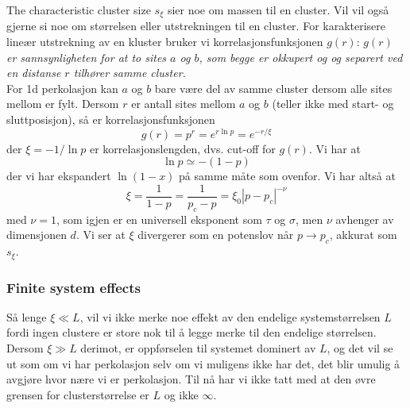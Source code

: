 \documentclass[english, a4paper]{article}
\begin{document}
\noindent
The characteristic cluster size $s_\xi$ sier noe om massen til en cluster. Vil vil også
gjerne si noe om størrelsen eller utstrekningen til en cluster. For karakterisere lineær
utstrekning av en kluster bruker vi korrelasjonsfunksjonen $g(r)$:
\indent \textit{$g(r)$ er sannsynligheten for at to sites $a$ og $b$, som begge er okkupert og
og separert ved en distanse $r$ tilhører samme cluster. }\\

\noindent
For 1d perkolasjon kan $a$ og $b$ bare være del av samme cluster dersom alle sites mellom er fylt. 
Dersom $r$ er antall sites mellom $a$ og $b$ (teller ikke med start- og sluttposisjon), så 
er korrelasjonsfunksjonen 
\begin{equation}
 g(r) = p^r = e^{r\ln{p}} = e^{-r/\xi}
\end{equation}
der $\xi = -1/\ln{p}$ er korrelasjonslengden, dvs. cut-off for $g(r)$. Vi har at
\begin{equation}
\ln{p} \simeq -(1-p)
\end{equation}
der vi har ekspandert $\ln{(1-x)}$ på samme måte som ovenfor. Vi har altså at
\begin{equation}
 \xi =  \frac{1}{1-p} = \frac{1}{p_c-p} = \xi_0|p - p_c|^{-\nu}
\end{equation}
med $\nu = 1$, som igjen er en universell eksponent som $\tau$ og $\sigma$, 
men $\nu$ avhenger av dimensjonen $d$. 
Vi ser at $\xi$ divergerer som en potenslov når $p \to p_c$, akkurat som $s_\xi$. 

\subsubsection{Finite system effects}
Så lenge $\xi \ll L$, vil vi ikke merke noe effekt av den endelige systemstørrelsen $L$ fordi
ingen clustere er store nok til å legge merke til den endelige størrelsen. Dersom $\xi \gg L$ derimot,
er oppførselen til systemet dominert av $L$, og det vil se ut som om vi har perkolasjon selv om 
vi muligens ikke har det, det blir umulig å avgjøre hvor nære vi er perkolasjon. Til nå har vi ikke 
tatt med at den øvre grensen for clusterstørrelse er $L$ og ikke $\infty$. 
\end{document}
